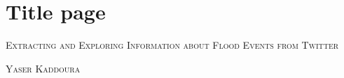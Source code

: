 \documentclass[a4paper, 12pt]{report}
\begin{document}

\thispagestyle{empty}
\section*{Title page}

\textsc{\large Extracting and Exploring Information about Flood Events from Twitter}

\textsc{\large Yaser Kaddoura}

\newpage\null\thispagestyle{blank}\newpage

\thispagestyle{empty}


\newpage\null\thispagestyle{blank}\newpage

\tableofcontents

\newpage

\listoffigures

\newpage

\listoftables
\newpage



\newpage




\newpage



\newpage



\newpage



\newpage



\newpage



\newpage



\newpage

\printbibliography[heading=bibintoc, title={References}]
\end{document}
